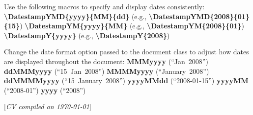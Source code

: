 \documentclass[letterpaper,MMMyyyy,nonstopmode]{simpleresumecv}
\newcommand{\CVNote}{CV compiled on {\today}}
\newcommand{\Code}[1]{\mbox{\textbf{#1}}}
\newcommand{\CodeCommand}[1]{\mbox{\textbf{\textbackslash{#1}}}}
\begin{document}
\begin{Body}
{\Gap
\BulletItem
Use the following macros to specify and display dates consistently:
\SubBulletItem
\CodeCommand{DatestampYMD\{yyyy\}\{MM\}\{dd\}}
(e.g., \CodeCommand{DatestampYMD\{2008\}\{01\}\{15\}})
\SubBulletItem
\CodeCommand{DatestampYM\{yyyy\}\{MM\}}
(e.g., \CodeCommand{DatestampYM\{2008\}\{01\}})
\SubBulletItem
\CodeCommand{DatestampY\{yyyy\}}
(e.g., \CodeCommand{DatestampY\{2008\}})

\Gap
\BulletItem
Change the date format option passed to the document class to adjust how dates are displayed throughout the document:
\SubBulletItem
\Code{MMMyyyy} (``Jan~2008'')
\SubBulletItem
\Code{ddMMMyyyy} (``15~Jan~2008'')
\SubBulletItem
\Code{MMMMyyyy} (``January~2008'')
\SubBulletItem
\Code{ddMMMMyyyy} (``15~January~2008'')
\SubBulletItem
\Code{yyyyMMdd} (``2008-01-15'')
\SubBulletItem
\Code{yyyyMM} (``2008-01'')
\SubBulletItem
\Code{yyyy} (``2008'')

\endgroup

\fi

\end{Body}


\UseNoteFont%
\null\hfill%
[\textit{\CVNote}]
\end{document}
